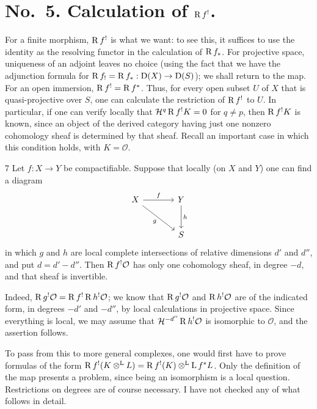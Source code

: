 \section*{No.\ 5. Calculation of $\operatorname{R} f^!$.}\label{appen:sec5}

For a finite morphism, $\operatorname{R} f^!$ is what we want: to see this, it suffices to use the identity as the resolving functor in the calculation of $\operatorname{R} f_*$. For projective space, uniqueness of an adjoint leaves no choice (using the fact that we have the adjunction formula for $\operatorname{R} f_!=\operatorname{R} f_*:\operatorname{D}(X)\to\operatorname{D}(S)$); we shall return to the map. For an open immersion, $\operatorname{R} f^!=\operatorname{R} f^*$. Thus, for every open subset $U$ of $X$ that is quasi-projective over $S$, one can calculate the restriction of $\operatorname{R} f^!$ to $U$. In particular, if one can verify locally that $\mathcal H^q\operatorname{R} f^!K=0$ for $q\ne p$, then $\operatorname{R} f^!K$ is known, since an object of the derived category having just one nonzero cohomology sheaf is determined by that sheaf. Recall an important case in which this condition holds, with $K=\mathcal O$.

\begin{samepage}
\begin{bookproposition}{7}\label{appen:prop7}
Let $f:X\to Y$ be compactifiable. Suppose that locally (on $X$ and $Y$) one can find a diagram
\[
\begin{tikzcd}[column sep=large,row sep=large]
X \ar[r,"f"] \ar[dr,"g"'] & Y \ar[d,"h"] \\
 & S
\end{tikzcd}
\]
in which $g$ and $h$ are local complete intersections of relative dimensions $d'$ and $d''$, and put $d=d'-d''$. Then $\operatorname{R} f^!\mathcal O$ has only one cohomology sheaf, in degree $-d$, and that sheaf is invertible.
\end{bookproposition}
\end{samepage}

Indeed, $\operatorname{R} g^!\mathcal O=\operatorname{R} f^!\operatorname{R} h^!\mathcal O$; we know that $\operatorname{R} g^!\mathcal O$ and $\operatorname{R} h^!\mathcal O$ are of the indicated form, in degrees $-d'$ and $-d''$, by local calculations in projective space. Since everything is local, we may assume that $\mathcal H^{-d''}\operatorname{R} h^!\mathcal O$ is isomorphic to $\mathcal O$, and the assertion follows.

To pass from this to more general complexes, one would first have to prove formulas of the form $\operatorname{R} f^!(K\mathbin{\otimes^{\mathrm{L}}} L)=\operatorname{R} f^!(K)\mathbin{\otimes^{\mathrm{L}}}\operatorname{L} f^*L$. Only the definition of the map presents a problem, since being an isomorphism is a local question. Restrictions on degrees are of course necessary. I have not checked any of what follows in detail.

